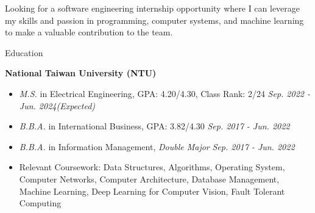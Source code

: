 \documentclass{resume} %
\newcommand{\itab}[1]{\hspace{0em}\rlap{#1}}
\begin{document}


Looking for a software engineering internship opportunity where I can leverage my skills and passion in programming, computer systems, and machine learning to make a valuable contribution to the team.



\begin{rSection}{Education}


{\bf National Taiwan University (NTU)}
\begin{itemize}
    \item \textit{M.S.} in {Electrical Engineering}, GPA: 4.20/4.30, Class Rank: 2/24  \hfill \textit{Sep. 2022 - Jun. 2024(Expected)}
    \item \textit{B.B.A.} in {International Business}, GPA: 3.82/4.30 \hfill \textit{Sep. 2017 - Jun. 2022}
    \item \textit{B.B.A.} in {Information Management}, \textit{Double Major} \hfill \textit{Sep. 2017 - Jun. 2022}
    \item {Relevant Coursework}: Data Structures,  Algorithms, Operating System, Computer Networks, Computer Architecture, Database Management, Machine Learning, Deep Learning for Computer Vision, Fault Tolerant Computing
\end{itemize}

\end{rSection}
\end{document}
